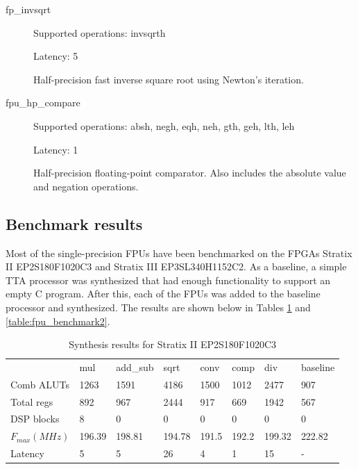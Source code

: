 \documentclass[twoside]{tceusermanual}
\begin{document}
\begin{description}
\item[fp\_invsqrt]

Supported operations: invsqrth

Latency:             5

Half-precision fast inverse square root using Newton's iteration.

\item[fpu\_hp\_compare]

Supported operations:         absh, negh, eqh, neh, gth, geh, lth, leh

Latency:             1

Half-precision floating-point comparator. Also includes the absolute value and negation operations.

\end{description}


\subsection{Benchmark results}

Most of the single-precision FPUs have been benchmarked on the FPGAs Stratix II EP2S180F1020C3 and 
Stratix III EP3SL340H1152C2. As a baseline, a simple TTA processor 
was synthesized that had enough functionality to support an empty C program. 
After this, each of the FPUs was added to the baseline processor and synthesized. 
The results are shown below in Tables \ref{table:fpu_benchmark1}
and \ref{table:fpu_benchmark2}.

\begin{table}
\begin{center}
\begin{tabular}{|l|l|l|l|l|l|l|l|}\cline{1-8}
 & mul & add\_sub & sqrt & conv & comp & div & baseline \\\cline{1-8}
Comb ALUTs & 1263 & 1591 & 4186 & 1500 & 1012 & 2477 & 907 \\\cline{1-8}
Total regs & 892 & 967 & 2444 & 917 & 669 & 1942 & 567 \\\cline{1-8}
DSP blocks & 8 & 0 & 0 & 0 & 0 & 0 & 0 \\\cline{1-8}
$F_{max} (MHz)$ & 196.39 & 198.81 & 194.78 & 191.5 & 192.2 & 199.32 & 222.82 \\\cline{1-8}
Latency & 5 & 5 & 26 & 4 & 1 & 15 & - \\\cline{1-8}
\end{tabular}
\end{center}
\caption{Synthesis results for Stratix II EP2S180F1020C3}
\label{table:fpu_benchmark1}
\end{table}
\end{document}
